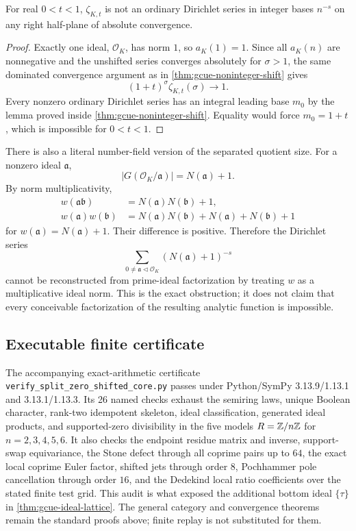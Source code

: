 \begin{corollary}
\label{cor:gcue-dedekind-noninteger}
For real $0<t<1$, $\zeta_{K,t}$ is not an ordinary Dirichlet series in integer bases
$n^{-s}$ on any right half-plane of absolute convergence.
\end{corollary}

\begin{proof}
Exactly one ideal, $\mathcal O_K$, has norm $1$, so $a_K(1)=1$.  Since all $a_K(n)$ are
nonnegative and the unshifted series converges absolutely for $\sigma>1$, the same dominated
convergence argument as in \cref{thm:gcue-noninteger-shift} gives
\[
 (1+t)^\sigma\zeta_{K,t}(\sigma)\longrightarrow1.
\]
Every nonzero ordinary Dirichlet series has an integral leading base $m_0$ by the lemma
proved inside \cref{thm:gcue-noninteger-shift}.  Equality would force $m_0=1+t$, which is
impossible for $0<t<1$.
\end{proof}

There is also a literal number-field version of the separated quotient size.  For a nonzero
ideal $\mathfrak a$,
\[
 |G(\mathcal O_K/\mathfrak a)|=N(\mathfrak a)+1.
\]
By norm multiplicativity,
\begin{align*}
 w(\mathfrak a\mathfrak b)
 &=N(\mathfrak a)N(\mathfrak b)+1,\\
 w(\mathfrak a)w(\mathfrak b)
 &=N(\mathfrak a)N(\mathfrak b)+N(\mathfrak a)+N(\mathfrak b)+1
\end{align*}
for $w(\mathfrak a)=N(\mathfrak a)+1$.  Their difference is positive.  Therefore the
Dirichlet series
\[
 \sum_{0\ne\mathfrak a\lhd\mathcal O_K}(N(\mathfrak a)+1)^{-s}
\]
cannot be reconstructed from prime-ideal factorization by treating $w$ as a multiplicative
ideal norm.  This is the exact obstruction; it does not claim that every conceivable
factorization of the resulting analytic function is impossible.

\subsection{Executable finite certificate}

The accompanying exact-arithmetic certificate
\texttt{verify\_split\_zero\_shifted\_core.py} passes under Python/SymPy
3.13.9/1.13.1 and 3.13.1/1.13.3.  Its 26 named checks exhaust the semiring laws, unique
Boolean character, rank-two idempotent skeleton, ideal classification, generated ideal
products, and supported-zero divisibility in the five models
$R=\mathbb{Z}/n\mathbb{Z}$ for $n=2,3,4,5,6$.  It also checks the endpoint residue matrix and inverse,
support-swap equivariance, the Stone defect through all coprime pairs up to $64$, the exact
local coprime Euler factor, shifted jets through order $8$, Pochhammer pole cancellation
through order $16$, and the Dedekind local ratio coefficients over the stated finite test
grid.  This audit is what exposed the additional bottom ideal $\{\tau\}$ in
\cref{thm:gcue-ideal-lattice}.  The general category and convergence theorems remain the
standard proofs above; finite replay is not substituted for them.

